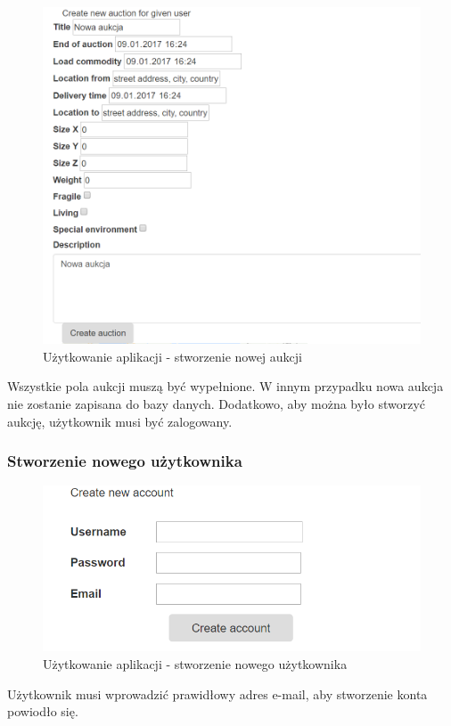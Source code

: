 \documentclass[10pt,titlepage]{article} %
\begin{document}
\begin{figure}[H]
\includegraphics[width=\textwidth]{img/sekcja4/stworzenieNowejAukcji}
\caption[Użytkowanie aplikacji - stworzenie nowej aukcji]{Użytkowanie aplikacji - stworzenie nowej aukcji}
\end{figure}

Wszystkie pola aukcji muszą być wypełnione. W innym przypadku nowa aukcja nie zostanie zapisana do bazy danych. Dodatkowo, aby można było stworzyć aukcję, użytkownik musi być zalogowany.

\subsubsection{Stworzenie nowego użytkownika}
\begin{figure}[H]
\includegraphics[width=\textwidth]{img/sekcja4/stworzenieNowegoUzytkownika}
\caption[Użytkowanie aplikacji - stworzenie nowego użytkownika]{Użytkowanie aplikacji - stworzenie nowego użytkownika}
\end{figure}
Użytkownik musi wprowadzić prawidłowy adres e-mail, aby stworzenie konta powiodło się.
\end{document}
